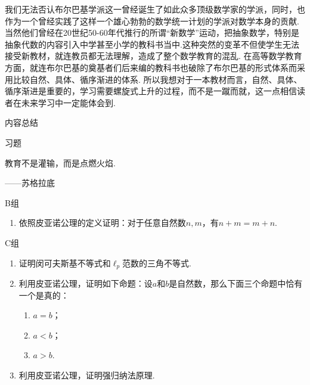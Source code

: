 我们无法否认布尔巴基学派这一曾经诞生了如此众多顶级数学家的学派，同时，也作为一个曾经实践了这样一个雄心勃勃的数学统一计划的学派对数学本身的贡献. 当然他们曾经在20世纪50-60年代推行的所谓``新数学''运动，把抽象数学，特别是抽象代数的内容引入中学甚至小学的教科书当中.这种突然的变革不但使学生无法接受新教材，就连教员都无法理解，造成了整个数学教育的混乱. 在高等数学教育方面，就连布尔巴基的奠基者们后来编的教科书也破除了布尔巴基的形式体系而采用比较自然、具体、循序渐进的体系. 所以我想对于一本教材而言，自然、具体、循序渐进是重要的，学习需要螺旋式上升的过程，而不是一蹴而就，这一点相信读者在未来学习中一定能体会到.

\vspace{2ex}
\centerline{\heiti \Large 内容总结}


\vspace{2ex}
\centerline{\heiti \Large 习题}

\vspace{2ex}
{\kaishu 教育不是灌输，而是点燃火焰.}
\begin{flushright}
    \kaishu
    ——苏格拉底
\end{flushright}

\centerline{\heiti B组}
\begin{enumerate}
    \item 依照皮亚诺公理的定义证明：对于任意自然数$n,m$，有$n+m=m+n$.
\end{enumerate}

\centerline{\heiti C组}
\begin{enumerate}
    \item 证明闵可夫斯基不等式和$\ell_p$范数的三角不等式.
    \item 利用皮亚诺公理，证明如下命题：设$a$和$b$是自然数，那么下面三个命题中恰有一个是真的：
    \begin{enumerate}
        \item $a=b$；
        \item $a<b$；
        \item $a>b$.
    \end{enumerate}
    \item 利用皮亚诺公理，证明强归纳法原理.
\end{enumerate}
